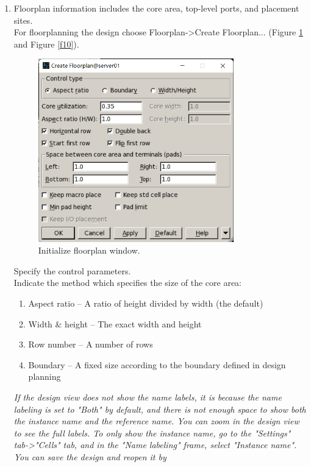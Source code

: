 \documentclass[a4paper,12pt,twoside]{article}
\begin{document}
\begin{enumerate}
    \begin{enumerate}
        \item Floorplan information includes the core area, top-level ports, and placement sites.\\
        For floorplanning the design choose Floorplan->Create Floorplan... (Figure \ref{f9} and Figure \ref{f10}).
        \begin{figure}[H]
            \centering
            \includegraphics[width=0.8\textwidth]{images/9.png}
            \caption{Initialize floorplan window.}
            \label{f9}
        \end{figure}
        Specify the control parameters.\\
        Indicate the method which specifies the size of the core area:
        \begin{enumerate}
            \item Aspect ratio – A ratio of height divided by width (the default)
            \item Width \& height – The exact width and height
            \item Row number – A number of rows
            \item Boundary – A fixed size according to the boundary defined in design planning
        \end{enumerate}
        \textit{If the design view does not show the name labels, it is because the name labeling is set to "Both" by default, and there is not enough space to show both the instance name and the reference name. You can zoom in the design view to see the full labels. To only show the instance name, go to the "Settings" tab->"Cells" tab, and in the "Name labeling" frame, select "Instance name". You can save the design and reopen it by}

\end{enumerate}
\end{enumerate}
\end{document}

